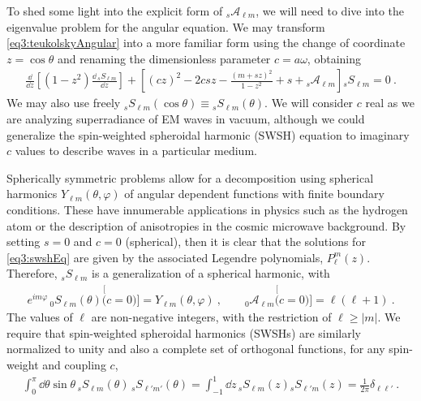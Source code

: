 To shed some light into the explicit form of ${}_{s}\mathscr{A}_{\ell m}$, we will need to dive into the eigenvalue problem for the angular equation. We may transform \eqref{eq3:teukolskyAngular} into a more familiar form using the change of coordinate $z=\cos\theta$ and renaming the dimensionless parameter $c=a \omega$, obtaining
\begin{align}
    \frac{\dd}{\dd z} \left[ (1-z^2) \frac{\dd\, {}_{s}S_{\ell m}}{\dd z} \right] + \left[ (c z)^2 - 2 c s z  -\frac{(m + s z)^2}{1 - z^2} + s  + {}_{s}\mathscr{A}_{\ell m} \right] {}_{s}S_{\ell m} = 0 ~.
    \label{eq3:swshEq}
\end{align}
We may also use freely ${}_{s}S_{\ell m}(\cos\theta) \equiv {}_{s}S_{\ell m}(\theta)$.
We will consider $c$ real as we are analyzing superradiance of EM waves in vacuum, although we could generalize the spin-weighted spheroidal harmonic (SWSH) equation to imaginary $c$ values to describe waves in a particular medium.

Spherically symmetric problems allow for a decomposition using spherical harmonics $Y_{\ell m}(\theta,\varphi)$ of angular dependent functions with finite boundary conditions.
These have innumerable applications in physics such as the hydrogen atom or the description of anisotropies in the cosmic microwave background.
By setting $s=0$ and $c=0$ (spherical), then it is clear that the solutions for \eqref{eq3:swshEq} are given by the associated Legendre polynomials, $P^m_\ell(z)$. Therefore, ${}_{s}S_{\ell m}$ is a generalization of a spherical harmonic, with
\begin{align}
    e^{i m \varphi} \,{}_{0}S_{\ell m}(\theta) \stackrel[(c=0)]{}{=} Y_{\ell m}(\theta,\varphi) ~,\qquad {}_{0}\mathscr{A}_{\ell m} \stackrel[(c=0)]{}{=} \ell (\ell + 1) ~.
\end{align}
The values of $\ell$ are non-negative integers, with the restriction of $\ell \ge |m|$. 
We require that spin-weighted spheroidal harmonics (SWSHs) are similarly normalized to unity and also a complete set of orthogonal functions, for any spin-weight and coupling $c$,
\begin{align}
    \label{eq3:SWSHorthogonality}
    \int_{0}^\pi \dd\theta \sin\theta \,{}_{s}S_{\ell m}(\theta) \,{}_{s}S_{\ell' m'}(\theta)  =
    \int_{-1}^{1} \dd z \,{}_{s}S_{\ell m}(z) {}_{s}S_{\ell' m}(z) = \frac{1}{2\pi} \delta_{\ell \ell'} ~.
\end{align}

